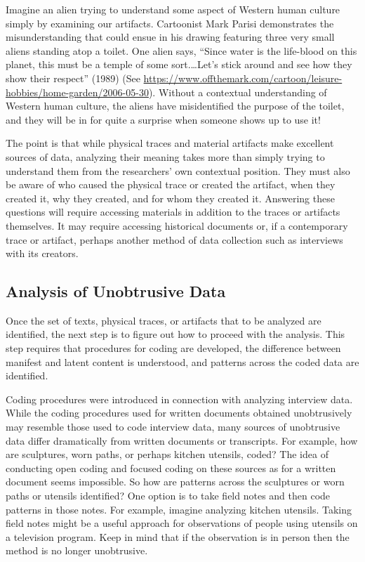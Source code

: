 Imagine an alien trying to understand some aspect of Western human culture simply by examining our artifacts. Cartoonist Mark Parisi demonstrates the misunderstanding that could ensue in his drawing featuring three very small aliens standing atop a toilet. One alien says, ``Since water is the life-blood on this planet, this must be a temple of some sort.…Let's stick around and see how they show their respect'' (1989) (See \url{https://www.offthemark.com/cartoon/leisure-hobbies/home-garden/2006-05-30}). Without a contextual understanding of Western human culture, the aliens have misidentified the purpose of the toilet, and they will be in for quite a surprise when someone shows up to use it!

The point is that while physical traces and material artifacts make excellent sources of data, analyzing their meaning takes more than simply trying to understand them from the researchers' own contextual position. They must also be aware of who caused the physical trace or created the artifact, when they created it, why they created, and for whom they created it. Answering these questions will require accessing materials in addition to the traces or artifacts themselves. It may require accessing historical documents or, if a contemporary trace or artifact, perhaps another method of data collection such as interviews with its creators.

\subsection{Analysis of Unobtrusive Data}

Once the set of texts, physical traces, or artifacts that to be analyzed are identified, the next step is to figure out how to proceed with the analysis. This step requires that procedures for coding are developed, the difference between manifest and latent content is understood, and patterns across the coded data are identified.

Coding procedures were introduced in connection with analyzing interview data. While the coding procedures used for written documents obtained unobtrusively may resemble those used to code interview data, many sources of unobtrusive data differ dramatically from written documents or transcripts. For example, how are sculptures, worn paths, or perhaps kitchen utensils, coded? The idea of conducting open coding and focused coding on these sources as for a written document seems impossible. So how are patterns across the sculptures or worn paths or utensils identified? One option is to take field notes and then code patterns in those notes. For example, imagine analyzing kitchen utensils. Taking field notes might be a useful approach for observations of people using utensils on a television program. Keep in mind that if the observation is in person then the method is no longer unobtrusive.

